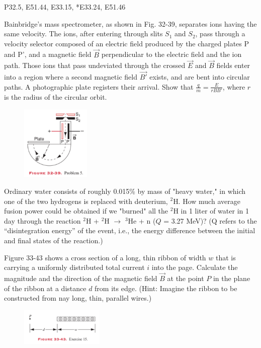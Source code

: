\documentclass[11pt,letterpaper,boxed]{pset}
\begin{document}
    \begin{center}
        P32.5, E51.44, E33.15, *E33.24, E51.46
    \end{center}
    
    \begin{problem} [P32.5]
    Bainbridge's mass spectrometer, as shown in Fig. 32-39, separates ions having the same velocity. The ions, after entering through slits $S_1$ and $S_2$, pass through a velocity selector composed of an electric field produced by the charged plates P and P', and a magnetic field $\Vec{B}$ perpendicular to the electric field and the ion path. Those ions that pass undeviated through the crossed $\Vec{E}$ and $\Vec{B}$ fields enter into a region where a second magnetic field $\Vec{B'}$ exists, and are bent into circular paths. A photographic plate registers their arrival. Show that $\frac{q}{m}=\frac{E}{rBB'}$, where $r$ is the radius of the circular orbit.
    \end{problem}
    \begin{figure} [ht]
        \includegraphics[width=125px]{HW6Images/32-5.png}
        \label{fig:P32-5}
    \end{figure}
    \newpage
    
    \begin{problem} [E51.44]
    Ordinary water consists of roughly 0.015\% by mass of "heavy water," in which one of the two hydrogens is replaced with deuterium, $^2$H. How much average fusion power could be obtained if we "burned" all the $^2$H in 1 liter of water in 1 day through the reaction $^2$H + $^2$H $\longrightarrow$ $^3$He + n ($Q$ = 3.27 MeV)? (Q refers to the “disintegration energy” of the event, i.e., the energy difference between the initial and final states of the reaction.)
    \end{problem}
    \newpage
    
    \begin{problem} [E33.15]
    Figure 33-43 shows a cross section of a long, thin ribbon of width $w$ that is carrying a uniformly distributed total current $i$ into the page. Calculate the magnitude and the direction of the magnetic field $\Vec{B}$ at the point $P$ in the plane of the ribbon at a distance $d$ from its edge. (Hint: Imagine the ribbon to be constructed from nay long, thin, parallel wires.)
    \end{problem}
    \begin{figure} [ht]
        \includegraphics[width=150px]{HW6Images/33-15.png}
        \label{fig:P33-15}
    \end{figure}
    \newpage
    
\end{document}
